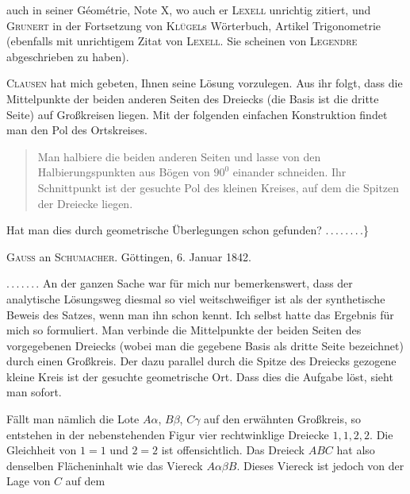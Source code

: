 auch in seiner Géométrie, Note X, wo auch er \textsc{Lexell} unrichtig zitiert, und \textsc{Grunert} in der Fortsetzung von \textsc{Klügel}s Wörterbuch, Artikel Trigonometrie (ebenfalls mit unrichtigem Zitat von \textsc{Lexell}. Sie scheinen von \textsc{Legendre} abgeschrieben zu haben).

\textsc{Clausen} hat mich gebeten, Ihnen seine Lösung vorzulegen. Aus ihr folgt, dass die Mittelpunkte der beiden anderen Seiten des Dreiecks (die Basis ist die dritte Seite) auf Großkreisen liegen. Mit der folgenden einfachen Konstruktion findet man den Pol des Ortskreises.

\begin{quote}
Man halbiere die beiden anderen Seiten und lasse von den Halbierungspunkten aus Bögen von $90^0$ einander schneiden. Ihr Schnittpunkt ist der gesuchte Pol des kleinen Kreises, auf dem die Spitzen der Dreiecke liegen.
\end{quote}

Hat man dies durch geometrische Überlegungen schon gefunden? \mbox{.\,.\,.\,.\,.\,.\,.\,.}\}

\medskip

\begin{center}
\textsc{Gauss} an \textsc{Schumacher}. Göttingen, 6. Januar 1842.
\end{center}

\mbox{.\,.\,.\,.\,.\,.\,.} An der ganzen Sache war für mich nur bemerkenswert, dass der analytische Lösungsweg diesmal so viel weitschweifiger ist als der synthetische Beweis des Satzes, wenn man ihn schon kennt. Ich selbst hatte das Ergebnis für mich so formuliert. Man verbinde die Mittelpunkte der beiden Seiten des vorgegebenen Dreiecks (wobei man die gegebene Basis als dritte Seite bezeichnet) durch einen Großkreis. Der dazu parallel durch die Spitze des Dreiecks gezogene kleine Kreis ist der gesuchte geometrische Ort. Dass dies die Aufgabe löst, sieht man sofort.

\begin{center}\end{center}

Fällt man nämlich die Lote $A\alpha$, $B\beta$, $C\gamma$ auf den erwähnten Großkreis, so entstehen in der nebenstehenden Figur vier rechtwinklige Dreiecke $1,1,2,2$. Die Gleichheit von $1=1$ und $2=2$ ist offensichtlich. Das Dreieck $ABC$ hat also denselben Flächeninhalt wie das Viereck $A\alpha\beta B$. Dieses Viereck ist jedoch von der Lage von $C$ auf dem\space%
